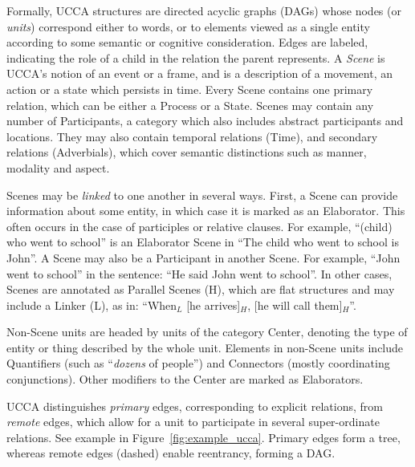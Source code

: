\documentclass[11pt,a4paper]{article}
\begin{document}
  Formally, UCCA structures are directed acyclic graphs (DAGs) whose nodes (or {\it units}) correspond either to words,
  or to elements viewed as a single entity according to some semantic or cognitive consideration.
  Edges are labeled, indicating the role of a child in the relation the parent represents.
  A {\it Scene} is UCCA's notion of an event or a frame, and is a description of a movement, an action or a state which persists in time. 
  Every Scene contains one primary relation, which can be either a Process or a State. 
  Scenes may contain any number of Participants, a category which also includes abstract participants and locations.
  They may also contain temporal relations (Time), and secondary relations (Adverbials), 
  which cover semantic distinctions such as manner, modality and aspect.

  Scenes may be \textit{linked} to one another in several ways.
  First, a Scene can provide information about some entity,
  in which case it is marked as an Elaborator.
  This often occurs in the case of participles or relative clauses.
  For example, ``(child) who went to school'' is an Elaborator Scene
  in ``The child who went to school is John''.
  A Scene may also be a Participant in another Scene. For example, ``John went to school'' in the sentence: ``He said John went to school''. 
  In other cases, Scenes are annotated as Parallel Scenes (H), which are flat structures and may include a Linker (L), 
  as in: ``When$_L$ [he arrives]$_H$, [he will call them]$_H$''.

  Non-Scene units are headed by units of the category Center,
  denoting the type of entity or thing described by the whole unit.
  Elements in non-Scene units include Quantifiers (such as ``{\it dozens} of people'') and
  Connectors (mostly coordinating conjunctions).
  Other modifiers to the Center are marked as Elaborators.
  
  
  UCCA distinguishes \textit{primary} edges, corresponding 
  to explicit relations, from \textit{remote} edges,
  which allow for a unit to participate
  in several super-ordinate relations.
  See example in Figure~\ref{fig:example_ucca}.
  Primary edges form a tree, whereas remote edges (dashed) enable reentrancy, forming a DAG.
\end{document}

